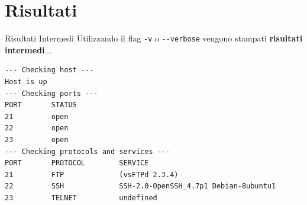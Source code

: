 \section{Risultati}


\begin{frame}[fragile]{Risultati Intermedi}
Utilizzando il flag \verb|-v| o \verb|--verbose| vengono stampati \textbf{risultati intermedi}...
\begin{lstlisting}[style=statale, basicstyle=\tiny]
--- Checking host ---                                                                                                                                                                                                
Host is up                                                                                                                                                                                          
--- Checking ports ---                                                                                                                                                                                               
PORT       STATUS                                                                                                                                                                                                    
21         open                                                                                                                                                                                                      
22         open                                                                                                                                                                                                      
23         open                                                                                                                                                                                                      
--- Checking protocols and services ---                                                                                                                                                                              
PORT       PROTOCOL        SERVICE                                                                                                                                                                                   
21         FTP             (vsFTPd 2.3.4)                                                                                                                                                                            
22         SSH             SSH-2.0-OpenSSH_4.7p1 Debian-8ubuntu1                                                                                                                                                     
23         TELNET          undefined                                                                                                                                                                                
\end{lstlisting}


\end{frame}
